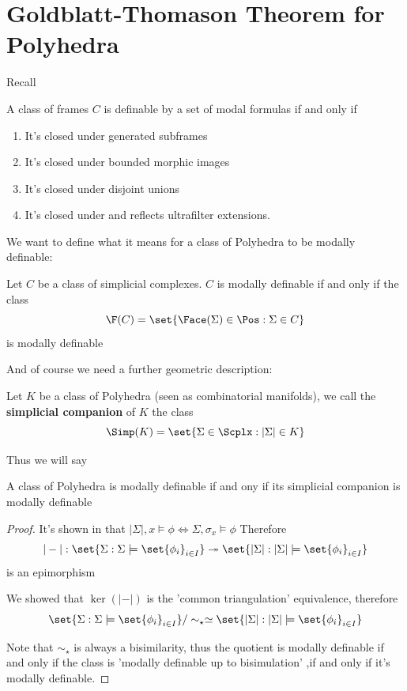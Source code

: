 \section{Goldblatt-Thomason Theorem for Polyhedra}

Recall 
\begin{theorem}
    A class of frames $C$ is definable by a set of modal formulas if and only if
    \begin{enumerate}
        \item It's closed under generated subframes
        \item It's closed under bounded morphic images
        \item It's closed under disjoint unions 
        \item It's closed under and reflects ultrafilter extensions.
    \end{enumerate}    
\end{theorem}

We want to define what it means for a class of Polyhedra to be modally definable:

\begin{definition}\hfill

    Let $C$ be a class of simplicial complexes. $C$ is modally definable if and only if the class
    \[\F(C)=\set{\Face(\Sigma)\in\Pos: \Sigma\in C}\] is modally definable
\end{definition}

And of course we need a further geometric description:
\begin{definition}\hfill 

    Let $K$ be a class of Polyhedra (seen as combinatorial manifolds), we call the \textbf{simplicial companion} of $K$ the class 
    \[\Simp(K)=\set{\Sigma\in\Scplx: |\Sigma|\in K}\]
\end{definition}
Thus we will say 
\begin{lemma}\hfill 

    A class of Polyhedra is modally definable if and ony if its simplicial companion is modally definable 
\end{lemma}
\begin{proof}
    It's shown in %
    that $|\Sigma|,x\models \phi\iff \Sigma,\sigma_x\models\phi$
    Therefore \[|-|:\set{\Sigma:\Sigma\models\set{\phi_i}_{i\in I}}\twoheadrightarrow\set{|\Sigma|:|\Sigma|\models\set{\phi_i}_{i\in I}}\]
    is an epimorphism

    We showed that $\ker(|-|)$ is the 'common triangulation' equivalence, therefore 
    \[\set{\Sigma:\Sigma\models\set{\phi_i}_{i\in I}}/\sim_{\star}\simeq \set{|\Sigma|:|\Sigma|\models\set{\phi_i}_{i\in I}}\]

    Note that $\sim_{\star}$ is always a bisimilarity, thus the quotient is modally definable if and only if the class is 'modally definable up to bisimulation'
    ,if and only if it's modally definable.
\end{proof}

